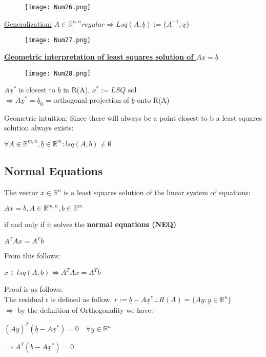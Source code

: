 \documentclass[8pt]{extreport}
\begin{document}
\begin{figure}[H]
\centering
\texttt{[image: Num26.png]}
\end{figure}

\underline{Generalization:} $A \in \mathbb{R}^{n,n} regular \Rightarrow Lsq(A,\underline{b}):= \{A^{-1},\underline{x}\}$
\begin{figure}[H]
\centering
\texttt{[image: Num27.png]}
\end{figure}

\underline{\textbf{Geometric interpretation of least squares solution of $A\underline{x} = \underline{b}$}}
\begin{figure}[H]
\centering
\texttt{[image: Num28.png]}
\end{figure}

$A\underline{x}^*$ is closest to $\underline{b}$ in R(A), $x^*:=LSQ$ sol\\
$\Rightarrow A\underline{x}^* = \underline{b}_0$ = orthogonal projection of $\underline{b}$ onto R(A)

Geometric intuition: Since there will always be a point closest to b a least squares solution always exists:
\begin{center}
$ \forall A \in \mathbb{R}^{m,n}, \underline{b} \in \mathbb{R}^m: lsq(A,b) \neq \emptyset$
\end{center}

\subsection{Normal Equations}

The vector $x \in \mathbb{R}^n$ is a least squares solution of the linear system of equations:
\begin{center}
$Ax = b, A \in \mathbb{R}^{m,n}, b \in \mathbb{R}^{m}$
\end{center}
if and only if it solves the \textbf{normal equations (NEQ)}
\begin{center}
$A^TAx = A^Tb$
\end{center}
From this follows:
\begin{center}
$x \in lsq(A,\underline{b}) \iff A^TAx = A^Tb$
\end{center}
Proof is as follows:\\
The residual r is defined as follow: $r:= \underline{b} - A\underline{x}^* \bot R(A) = \{A\underline{y}: \underline{y} \in \mathbb{R}^n\}$\\
$\Rightarrow$ by the definition of Orthogonality we have:
\begin{center}
$(A\underline{y})^T(\underline{b} - A \underline{x}^*) = 0 \quad \forall \underline{y} \in \mathbb{R}^n$
\end{center}
$\Rightarrow A^T(b -A\underline{x}^*) = 0$
\newline
\end{document}
